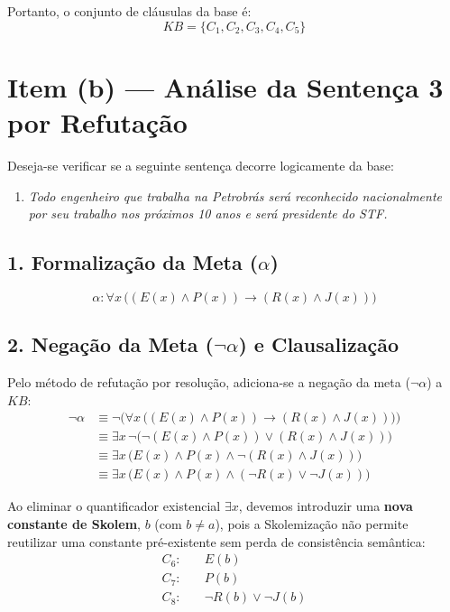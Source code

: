 \documentclass[11pt,a4paper]{article}
\begin{document}
Portanto, o conjunto de cláusulas da base é:
\[
KB = \{ C_1, C_2, C_3, C_4, C_5 \}
\]

\section*{Item (b) --- Análise da Sentença 3 por Refutação}

Deseja-se verificar se a seguinte sentença decorre logicamente da base:
\begin{enumerate}
    \item[\textbf{3.}] \textit{Todo engenheiro que trabalha na Petrobrás será reconhecido nacionalmente por seu trabalho nos próximos 10 anos e será presidente do STF.}
\end{enumerate}

\subsection*{1. Formalização da Meta ($\alpha$)}
\[
\alpha: \forall x \, \Big( (E(x) \land P(x)) \to (R(x) \land J(x)) \Big)
\]

\subsection*{2. Negação da Meta ($\neg \alpha$) e Clausalização}
Pelo método de refutação por resolução, adiciona-se a negação da meta ($\neg \alpha$) a $KB$:
\begin{align*}
\neg \alpha & \equiv \neg \Big( \forall x \, \big( (E(x) \land P(x)) \to (R(x) \land J(x)) \big) \Big) \\
& \equiv \exists x \, \neg \Big( \neg(E(x) \land P(x)) \lor (R(x) \land J(x)) \Big) \\
& \equiv \exists x \, \Big( E(x) \land P(x) \land \neg(R(x) \land J(x)) \Big) \\
& \equiv \exists x \, \Big( E(x) \land P(x) \land (\neg R(x) \lor \neg J(x)) \Big)
\end{align*}

Ao eliminar o quantificador existencial $\exists x$, devemos introduzir uma \textbf{nova constante de Skolem}, $b$ (com $b \neq a$), pois a Skolemização não permite reutilizar uma constante pré-existente sem perda de consistência semântica:
\begin{align*}
C_6: & \quad E(b) \\
C_7: & \quad P(b) \\
C_8: & \quad \neg R(b) \lor \neg J(b)
\end{align*}
\end{document}
